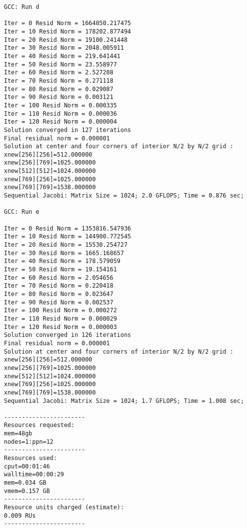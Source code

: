 \documentclass[11pt]{article}
\begin{document}
\begin{lstlisting}
GCC: Run d
 
Iter = 0 Resid Norm = 1664850.217475
Iter = 10 Resid Norm = 178202.877494
Iter = 20 Resid Norm = 19100.241448
Iter = 30 Resid Norm = 2048.005911
Iter = 40 Resid Norm = 219.641441
Iter = 50 Resid Norm = 23.558977
Iter = 60 Resid Norm = 2.527208
Iter = 70 Resid Norm = 0.271118
Iter = 80 Resid Norm = 0.029087
Iter = 90 Resid Norm = 0.003121
Iter = 100 Resid Norm = 0.000335
Iter = 110 Resid Norm = 0.000036
Iter = 120 Resid Norm = 0.000004
Solution converged in 127 iterations
Final residual norm = 0.000001
Solution at center and four corners of interior N/2 by N/2 grid : 
xnew[256][256]=512.000000
xnew[256][769]=1025.000000
xnew[512][512]=1024.000000
xnew[769][256]=1025.000000
xnew[769][769]=1538.000000
Sequential Jacobi: Matrix Size = 1024; 2.0 GFLOPS; Time = 0.876 sec; 
 
GCC: Run e
 
Iter = 0 Resid Norm = 1353816.547936
Iter = 10 Resid Norm = 144900.772545
Iter = 20 Resid Norm = 15530.254727
Iter = 30 Resid Norm = 1665.168657
Iter = 40 Resid Norm = 178.579059
Iter = 50 Resid Norm = 19.154161
Iter = 60 Resid Norm = 2.054656
Iter = 70 Resid Norm = 0.220418
Iter = 80 Resid Norm = 0.023647
Iter = 90 Resid Norm = 0.002537
Iter = 100 Resid Norm = 0.000272
Iter = 110 Resid Norm = 0.000029
Iter = 120 Resid Norm = 0.000003
Solution converged in 126 iterations
Final residual norm = 0.000001
Solution at center and four corners of interior N/2 by N/2 grid : 
xnew[256][256]=512.000000
xnew[256][769]=1025.000000
xnew[512][512]=1024.000000
xnew[769][256]=1025.000000
xnew[769][769]=1538.000000
Sequential Jacobi: Matrix Size = 1024; 1.7 GFLOPS; Time = 1.008 sec; 

-----------------------
Resources requested:
mem=48gb
nodes=1:ppn=12
-----------------------
Resources used:
cput=00:01:46
walltime=00:00:29
mem=0.034 GB
vmem=0.157 GB
-----------------------
Resource units charged (estimate):
0.009 RUs
-----------------------
\end{lstlisting}
\end{document}
